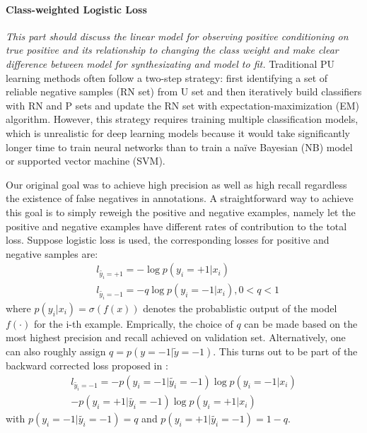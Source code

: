 \paragraph{Class-weighted Logistic Loss}
\noindent \textit{This part should discuss the linear model for observing positive conditioning on true positive and its relationship to changing the class weight and make clear difference between model for synthesizating and model to fit.}
Traditional PU learning methods often follow a two-step strategy: first identifying a set of reliable negative samples (RN set) from U set and then iteratively build classifiers with RN and P sets and update the RN set with expectation-maximization (EM) algorithm.
However, this strategy requires training multiple classification models, which is unrealistic for deep learning models because it would take significantly longer time to train neural networks than to train a naïve Bayesian (NB) model or supported vector machine (SVM).

\noindent
Our original goal was to achieve high precision as well as high recall regardless the existence of false negatives in annotations.
A straightforward way to achieve this goal is to simply reweigh the positive and negative examples, namely let the positive and negative examples have different rates of contribution to the total loss.
Suppose logistic loss is used, the corresponding losses for positive and negative samples are:
\begin{equation*}
  \begin{aligned}
    & l_{\tilde{y_i}=+1} = - \log p(y_i=+1|x_i) \\
    & l_{\tilde{y_i}=-1} = - q \log p(y_i=-1 \vert x_i), 0<q<1
  \end{aligned}
\end{equation*}
where $p(y_i \vert x_i)=\sigma(f(x))$ denotes the probablistic output of the model $f(\cdot)$ for the i-th example. Emprically, the choice of $q$ can be made based on the most highest precision and recall achieved on validation set.
Alternatively, one can also roughly assign $q=p(y=-1 \vert \tilde{y}=-1)$.
This turns out to be part of the backward corrected loss proposed in \cite{patrini2016making}:
\begin{equation*}
  \begin{aligned}
    l_{\tilde{y_i}=-1} = - p(y_i=-1 \vert \tilde{y_i}=-1) \log p(y_i=-1 \vert x_i) \\ - p(y_i=+1 \vert \tilde{y_i}=-1) \log p(y_i=+1 \vert x_i)
  \end{aligned}
\end{equation*}
with $p(y_i=-1 \vert \tilde{y_i}=-1) = q$ and $p(y_i=+1 \vert \tilde{y_i}=-1) = 1-q$.


